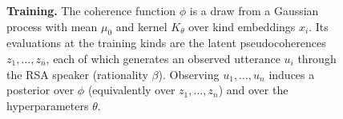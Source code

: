 \begin{figure}[ht]
  \caption{\textbf{Training.} The coherence function $\phi$ is a draw from a
    Gaussian process with mean $\mu_0$ and kernel $K_\theta$ over kind
    embeddings $x_i$. Its evaluations at the training kinds are the latent
    pseudocoherences $z_1,\dots,z_n$, each of which generates an observed
    utterance $u_i$ through the RSA speaker (rationality $\beta$). Observing
    $u_1,\dots,u_n$ induces a posterior over $\phi$ (equivalently over
    $z_1,\dots,z_n$) and over the hyperparameters $\theta$.}
  \label{fig:gm-train}
\end{figure}



